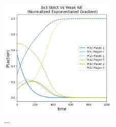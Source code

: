 \begin{figure}
    \centering
    \includegraphics[width=0.5\textwidth]{logos/Weak3x3-2.png}
    \caption{...}
    \label{Weak3x3-2}
\end{figure}
